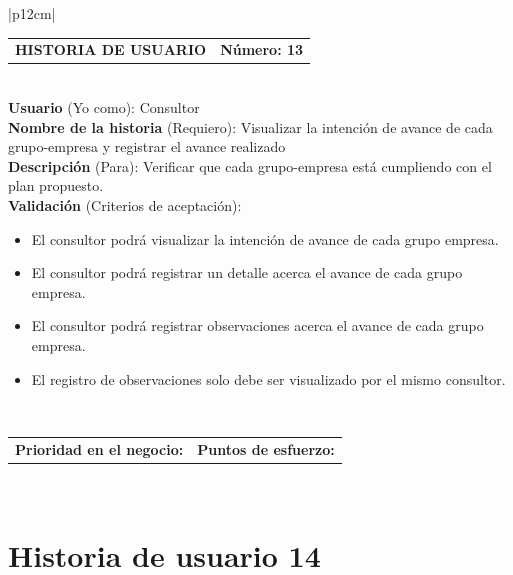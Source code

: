 \documentclass[11pt,letterpaper]{report}
\begin{document}
	\begin{center}	
		\begin{tabular}{|p{12cm}|}
			\hline
			\begin{tabular}{c|c}
				\textbf{HISTORIA DE USUARIO} & \textbf{Número: 13} \\
			\end{tabular} \\ \hline
			\textbf{Usuario} (Yo como): Consultor \\ \hline
			\textbf{Nombre de la historia} (Requiero): Visualizar la intención de avance de cada grupo-empresa y registrar el avance realizado \\ \hline
			\textbf{Descripción} (Para): Verificar que cada grupo-empresa está cumpliendo con el plan propuesto. \\ \hline
			\textbf{Validación} (Criterios de aceptación): \\
			\begin{minipage}{12cm}
				\begin{itemize}
					\item El consultor podrá visualizar la intención de avance de cada grupo empresa.
					\item El consultor podrá registrar un detalle acerca el avance de cada grupo empresa.
					\item El consultor podrá registrar observaciones acerca el avance de cada grupo empresa.
					\item El registro de observaciones solo debe ser visualizado por el mismo consultor.
				\end{itemize}
			\end{minipage} \\ \hline
			\begin{tabular}{c|c}
				\textbf{Prioridad en el negocio: } & \textbf{Puntos de esfuerzo: } \\
			\end{tabular} \\ \hline
		\end{tabular}
	\end{center}
	
	\section{Historia de usuario 14}
	
\end{document}
